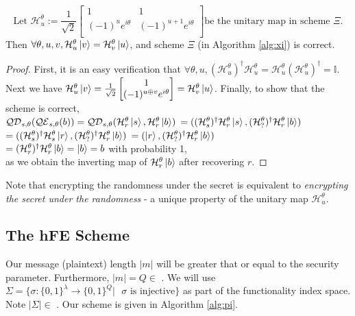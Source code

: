\begin{theorem} 
\label{thm:xi-correct}
\[ \text{Let } \mathcal{H}^\theta_u := \frac{1}{\sqrt{2}}
\begin{bmatrix}
    1 & 1 \\
    (-1)^u e^{i\theta} & (-1)^{u+1} e^{i\theta} \\
\end{bmatrix}
\text{be the unitary map in scheme $\Xi$.} \]
\noindent Then $\forall \theta,u,v, \mathcal{H}^\theta_u\ket{v} = \mathcal{H}^\theta_v\ket{u}$, and scheme $\Xi$ (in Algorithm \ref{alg:xi}) is correct.
\end{theorem}
\begin{proof}
First, it is an easy verification that 
$\forall \theta,u, (\mathcal{H}^\theta_u)^\dagger\mathcal{H}^\theta_u = \mathcal{H}^\theta_u(\mathcal{H}^\theta_u)^\dagger = \mathbb{I}$. 
Next we have $\mathcal{H}^\theta_u \ket{v} = \frac{1}{\sqrt{2}} \colvec{1}{(-1)^{u \oplus v}e^{i\theta}} = \mathcal{H}^\theta_v \ket{u}$. Finally, to show that the scheme is correct, \\
$\mathcal{QD}_{s,\theta}(\mathcal{QE}_{s,\theta}(b)) = \mathcal{QD}_{s,\theta}(\mathcal{H}^\theta_r\ket{s},\mathcal{H}^\theta_r\ket{b})$
$ = ((\mathcal{H}^\theta_s)^\dagger\mathcal{H}^\theta_r\ket{s},(\mathcal{H}^\theta_?)^\dagger\mathcal{H}^\theta_r\ket{b})$ \\
$ = ((\mathcal{H}^\theta_s)^\dagger\mathcal{H}^\theta_s\ket{r},(\mathcal{H}^\theta_?)^\dagger\mathcal{H}^\theta_r\ket{b})$
$ = (\ket{r},(\mathcal{H}^\theta_?)^\dagger\mathcal{H}^\theta_r\ket{b})$ \\
$ = (\mathcal{H}^\theta_r)^\dagger\mathcal{H}^\theta_r\ket{b}  = \ket{b} = b $ with probability 1, \\
as we obtain the inverting map of $\mathcal{H}^\theta_r\ket{b}$ after recovering $r$.
\end{proof}

\noindent Note that encrypting the randomness under the secret is equivalent to \emph{encrypting the secret under the randomness } - a unique property of the unitary map $\mathcal{H}^\theta_u$.

\subsection{The hFE Scheme}
\label{sec:pi}

Our message (plaintext) length $|m|$ will be greater that or equal to the security parameter. Furthermore, $|m| = Q \in$ \poly. 
We will use $\Sigma = \{ \sigma:\{0,1\}^\lambda \rightarrow \{0,1\}^Q | \text{ } \sigma \text{ is injective} \}$ as part of the functionality index space. Note $|\Sigma| \in $ \expo. Our scheme is given in Algorithm \ref{alg:pi}.

